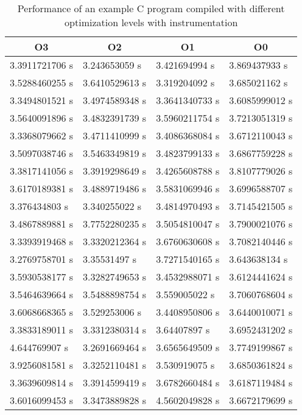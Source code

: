 \begin{table}
  \caption{Performance of an example C program compiled with different optimization levels with instrumentation}
  \label{table:instrumented_optimizations_benchmark}
  \centering
  \begin{tabular}{llll}
    \multicolumn{1}{c}{O3} & \multicolumn{1}{c}{O2} & \multicolumn{1}{c}{O1} & \multicolumn{1}{c}{O0} \\ \hline
    3.3911721706 s & 3.243653059 s  & 3.421694994 s  & 3.869437933 s  \\
    3.5288460255 s & 3.6410529613 s & 3.319204092 s  & 3.685021162 s  \\
    3.3494801521 s & 3.4974589348 s & 3.3641340733 s & 3.6085999012 s \\
    3.5640091896 s & 3.4832391739 s & 3.5960211754 s & 3.7213051319 s \\
    3.3368079662 s & 3.4711410999 s & 3.4086368084 s & 3.6712110043 s \\
    3.5097038746 s & 3.5463349819 s & 3.4823799133 s & 3.6867759228 s \\
    3.3817141056 s & 3.3919298649 s & 3.4265608788 s & 3.8107779026 s \\
    3.6170189381 s & 3.4889719486 s & 3.5831069946 s & 3.6996588707 s \\
    3.376434803 s  & 3.340255022 s  & 3.4814970493 s & 3.7145421505 s \\
    3.4867889881 s & 3.7752280235 s & 3.5054810047 s & 3.7900021076 s \\
    3.3393919468 s & 3.3320212364 s & 3.6760630608 s & 3.7082140446 s \\
    3.2769758701 s & 3.35531497 s   & 3.7271540165 s & 3.643638134 s  \\
    3.5930538177 s & 3.3282749653 s & 3.4532988071 s & 3.6124441624 s \\
    3.5464639664 s & 3.5488898754 s & 3.559005022 s  & 3.7060768604 s \\
    3.6068668365 s & 3.529253006 s  & 3.4408950806 s & 3.6440010071 s \\
    3.3833189011 s & 3.3312380314 s & 3.64407897 s   & 3.6952431202 s \\
    4.644769907 s  & 3.2691669464 s & 3.6565649509 s & 3.7749199867 s \\
    3.9256081581 s & 3.3252110481 s & 3.530919075 s  & 3.6850361824 s \\
    3.3639609814 s & 3.3914599419 s & 3.6782660484 s & 3.6187119484 s \\
    3.6016099453 s & 3.3473889828 s & 4.5602049828 s & 3.6672179699 s \\

\end{tabular}
\end{table}
